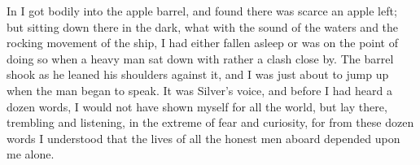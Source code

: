 In I got bodily into the apple barrel, and found there was scarce an apple left; but sitting down there in the dark, what with the sound of the waters and the rocking movement of the ship, I had either fallen asleep or was on the point of doing so when a heavy man sat down with rather a clash close by. The barrel shook as he leaned his shoulders against it, and I was just about to jump up when the man began to speak. It was Silver's voice, and before I had heard a dozen words, I would not have shown myself for all the world, but lay there, trembling and listening, in the extreme of fear and curiosity, for from these dozen words I understood that the lives of all the honest men aboard depended upon me alone.